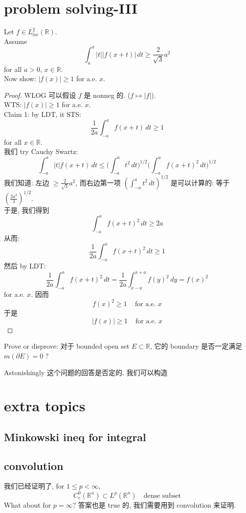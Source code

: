 \documentclass[lang=cn,11pt]{elegantbook}
\begin{document}
\chapter{problem solving-III}

\begin{example}
    Let $f \in L^2_{loc} (\mathbb{R})$.\\
    Assume \[
    \int_a^a |t||f(x+t)|\, dt \geq \frac{2}{\sqrt{3}}a^2
    \]for all $a> 0$, $x\in\mathbb{R}$.\\
Now show: $|f(x)| \geq 1$ for a.e. $x$.\\
\begin{proof}
    WLOG 可以假设 $f$ 是 nonneg 的. ($f\mapsto |f|$).\\
    WTS: $|f(x)| \geq 1$ for a.e. $x$. \\
Claim 1: by LDT, it STS: \[
\frac{1}{2a} \int_{-a}^a  f(x+t)\, dt  \geq 1
\]for all $x\in \mathbb{R}$.\\


我们 try Cauchy Swartz:
\[
\int_{-a}^a  |t| f(x+ t) \, dt \leq \bigg(\int_{-a}^a t^2 \, dt   \bigg)^{1/2} \bigg(\int_{-a}^a   f(x+t)^2 \, dt   \bigg)^{1/2}
\]
我们知道: 左边 $\geq \frac{2}{\sqrt{3}} a^2$, 而右边第一项 $(\int_{-a}^a  t^2 \, dt   )^{1/2}$ 是可以计算的: 等于 $(\frac{2a^3}{3})^{1/2}$.\\
于是, 我们得到 \[
\int_{-a}^a  f(x+t)^2 \, dt \geq 2a
\]
从而: 
\[
\frac{1}{2a}\int_{-a}^a  f(x+t)^2 \, dt \geq 1
\]
然后 by LDT: \[
\frac{1}{2a}\int_{-a}^a  f(x+t)^2 \, dt = \frac{1}{2a}\int_{x-a}^{x+a}  f(y)^2 \, dy =    f(x)
^2 \]
for a.e. $x$. 因而 \[
 f(x)^2 \geq 1\,\quad \text{for a.e. }  x
\]于是 \[
| f(x)| \geq 1\,\quad \text{for a.e. }  x
\]
\end{proof}
\end{example}





\begin{example}
    Prove or disprove: 对于 bounded open set $E \subset \mathbb{R}$, 它的 boundary 是否一定满足 $m(\partial E) = 0$ ? \\
    \begin{solution}
        Astonishingly 这个问题的回答是否定的. 我们可以构造
    \end{solution}
\end{example}



 


\chapter{extra topics}

\section{Minkowski ineq for integral}



\section{convolution}
我们已经证明了, for $1\leq p< \infty$, \[
C_c^0(\mathbb{R}^n)  \subset L^p(\mathbb{R}^n) \quad\text{dense subset}
\]What about for $p = \infty$? 答案也是 true 的, 我们需要用到 convolution 来证明.\\







\printbibliography
\appendix
\end{document}
